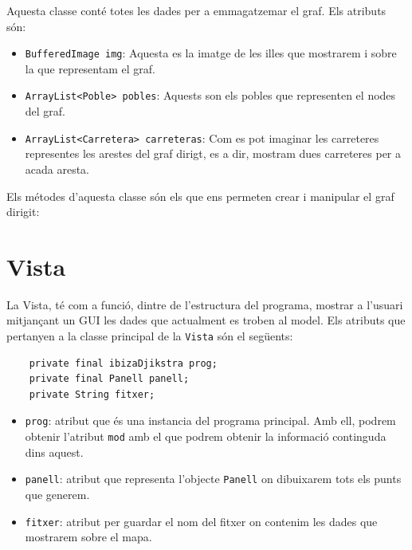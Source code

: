 \documentclass[conference]{IEEEtran}
\begin{document}
Aquesta classe conté totes les dades per a emmagatzemar el graf. Els atributs són: 

    \begin{itemize}
        \item \texttt{BufferedImage img}: Aquesta es la imatge de les illes que mostrarem i sobre la que representam el graf. \\
        \item \texttt{ArrayList<Poble> pobles}: Aquests son els pobles que representen el nodes del graf.\\
        \item \texttt{ArrayList<Carretera> carreteras}: Com es pot imaginar les carreteres representes les arestes del graf dirigt, es a dir, mostram dues carreteres per a acada aresta.\\
    \end{itemize}

Els métodes d'aquesta classe són els que ens permeten crear i manipular el graf dirigit:
\section{Vista}
La Vista, té com a funció, dintre de l’estructura del programa, mostrar a l’usuari mitjançant un GUI les dades que actualment es troben al model. Els atributs que pertanyen a la
classe principal de la \texttt{Vista} són el següents:
\begin{verbatim}
    private final ibizaDjikstra prog;
    private final Panell panell;
    private String fitxer;
\end{verbatim}
\begin{itemize}
    \item \texttt{prog}: atribut que és una instancia del programa principal. Amb ell, podrem obtenir l'atribut \texttt{mod} amb el que podrem obtenir la informació continguda dins aquest.\\
    \item \texttt{panell}: atribut que representa l'objecte \texttt{Panell} on dibuixarem tots els punts que generem.\\
    \item \texttt{fitxer}: atribut per guardar el nom del fitxer on contenim les dades que mostrarem sobre el mapa.\\
\end{itemize}
\end{document}
